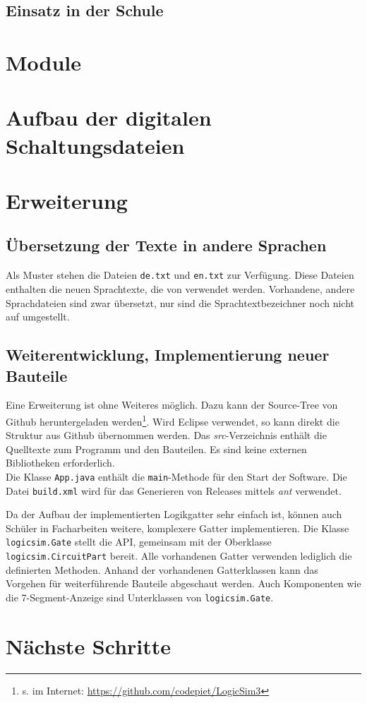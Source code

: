 \documentclass[12pt]{scrartcl}
\begin{document}
\subsection{Einsatz in der Schule}
\section{Module}
\section{Aufbau der digitalen Schaltungsdateien}
\section{Erweiterung}
\subsection{Übersetzung der Texte in andere Sprachen}
Als Muster stehen die Dateien \texttt{de.txt} und \texttt{en.txt} zur Verfügung. Diese Dateien enthalten die neuen Sprachtexte, die von \lsN{} verwendet werden. Vorhandene, andere Sprachdateien sind zwar übersetzt, nur sind die Sprachtextbezeichner noch nicht auf \lsN{} umgestellt.

\subsection{Weiterentwicklung, Implementierung neuer Bauteile}
Eine Erweiterung ist ohne Weiteres möglich. Dazu kann der Source-Tree von Github heruntergeladen werden\footnote{s. im Internet: \url{https://github.com/codepiet/LogicSim3}}. Wird Eclipse verwendet, so kann direkt die Struktur aus Github übernommen werden. Das \textit{src}-Verzeichnis enthält die Quelltexte zum Programm und den Bauteilen. Es sind keine externen Bibliotheken erforderlich.\\

Die Klasse \texttt{App.java} enthält die \texttt{main}-Methode für den Start der Software.
Die Datei \texttt{build.xml} wird für das Generieren von Releases mittels \textit{ant} verwendet.

Da der Aufbau der implementierten Logikgatter sehr einfach ist, können auch Schüler in Facharbeiten weitere, komplexere Gatter implementieren. Die Klasse \texttt{logicsim.Gate} stellt die API, gemeinsam mit der Oberklasse \texttt{logicsim.CircuitPart} bereit. Alle vorhandenen Gatter verwenden lediglich die definierten Methoden. Anhand der vorhandenen Gatterklassen kann das Vorgehen für weiterführende Bauteile abgeschaut werden. Auch Komponenten wie die 7-Segment-Anzeige sind Unterklassen von \texttt{logicsim.Gate}.\\

\section{Nächste Schritte}
\end{document}
